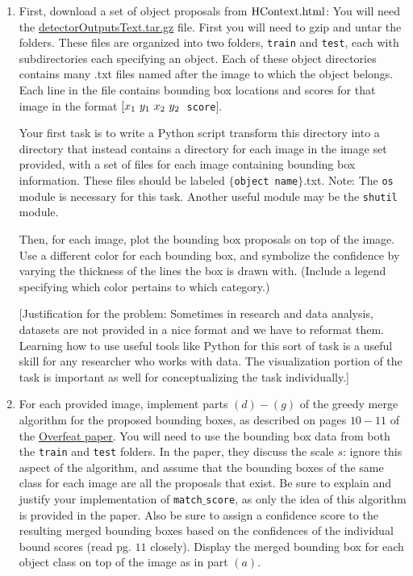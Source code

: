 \documentclass[12pt]{article}
\newcommand{\txt}[1]
{\textnormal{#1}}
\begin{document}
\begin{enumerate}

\item First, download a set of object proposals from \href{http://people.csail.mit.edu/myungjin/HContext.html}{$\txt{HContext.html}$}: You will need the \href{http://groups.csail.mit.edu/vision/Hcontext/data/detectorOutputsText.tar.gz}{detectorOutputsText.tar.gz} file. First you will need to gzip and untar the folders. These files are organized into two folders, \texttt{train} and \texttt{test}, each with subdirectories each specifying an object. Each of these object directories contains many .txt files named after the image to which the object belongs. Each line in the file contains bounding box locations and scores for that image in the format $[x_1 \txt{ } y_1 \txt{ } x_2 \txt{ } y_2 $\texttt{ score}$]$. 

Your first task is to write a Python script transform this directory into a directory that instead contains a directory for each image in the image set provided, with a set of files for each image containing bounding box information. These files should be labeled $\{$\texttt{object name}$\}$.txt. Note: The \texttt{os} module is necessary for this task. Another useful module may be the \texttt{shutil} module.

Then, for each image, plot the bounding box proposals on top of the image. Use a different color for each bounding box, and symbolize the confidence by varying the thickness of the lines the box is drawn with. (Include a legend specifying which color pertains to which category.)

[Justification for the problem: Sometimes in research and data analysis, datasets are not provided in a nice format and we have to reformat them. Learning how to use useful tools like Python for this sort of task is a useful skill for any researcher who works with data. The visualization portion of the task is important as well for conceptualizing the task individually.]

\item For each provided image, implement parts $(d)-(g)$ of the greedy merge algorithm for the proposed bounding boxes, as described on pages $10-11$ of the \href{http://arxiv.org/pdf/1312.6229v4.pdf}{Overfeat paper}. You will need to use the bounding box data from both the \texttt{train} and \texttt{test} folders. In the paper, they discuss the scale $s$: ignore this aspect of the algorithm, and assume that the bounding boxes of the same class for each image are all the proposals that exist. Be sure to explain and justify your implementation of \texttt{match$\_$score}, as only the idea of this algorithm is provided in the paper. Also be sure to assign a confidence score to the resulting merged bounding boxes based on the confidences of the individual bound scores (read pg. $11$ closely). Display the merged bounding box for each object class on top of the image as in part $(a)$.


\end{enumerate}
\end{document}
